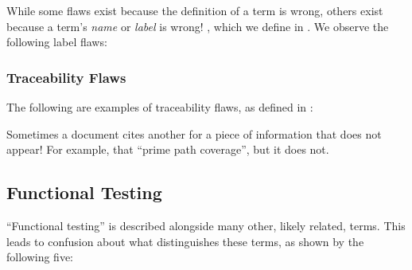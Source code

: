 While some flaws exist because the definition of a term is wrong,
others exist because a term's \emph{name} or \emph{label} is wrong!
, which we define in .
We observe the following label flaws:



\subsubsection{Traceability Flaws}\label{trace}

\ifnotpaper
    The following are examples of traceability flaws, as defined in
    :
    
\else
    Sometimes a document cites another for a piece of information that does not
    appear! For example, \citet[p.~184]{DoğanEtAl2014} 
    that \citet{SakamotoEtAl2013}  ``prime path
    coverage'', but it does not.
\fi


\subsection{Functional Testing}
\label{func-test-flaw}

``Functional testing'' is described alongside many other, likely related,
terms. This leads to confusion about what distinguishes these terms, as shown
by the following five:

